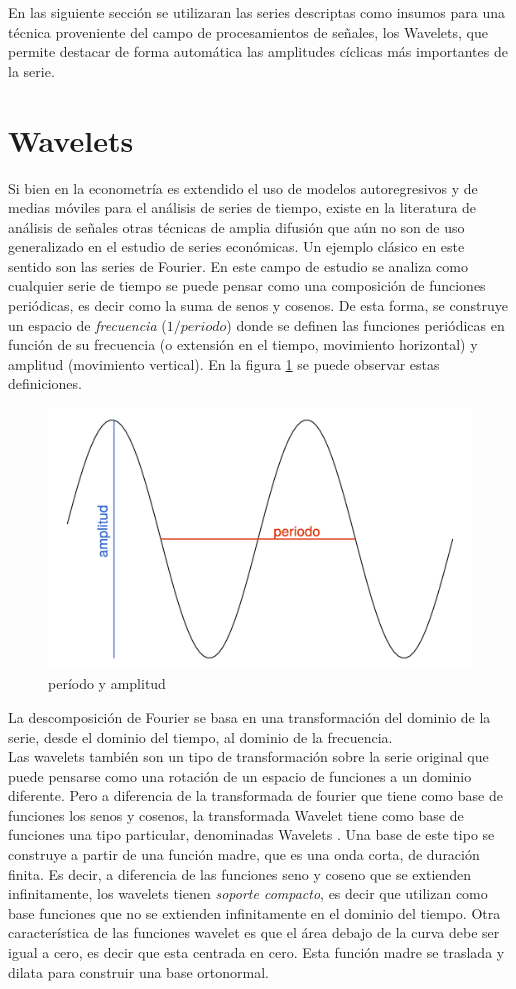 \documentclass[a4paper]{article}
\begin{document}
En las siguiente sección se utilizaran las series descriptas como insumos para una técnica proveniente del campo de procesamientos de señales, los Wavelets, que permite destacar de forma automática las amplitudes cíclicas más importantes de la serie.

\section{Wavelets}

Si bien en la econometría es extendido el uso de modelos autoregresivos y de medias móviles para el análisis de series de tiempo, existe en la literatura de análisis de señales otras técnicas de amplia difusión que aún no son de uso generalizado en el estudio de series económicas. Un ejemplo clásico en este sentido son las series de Fourier. En este campo de estudio se analiza como cualquier serie de tiempo se puede pensar como una composición de funciones periódicas, es decir como la suma de senos y cosenos. De esta forma, se construye un espacio de \textit{frecuencia} ($1/periodo$) donde se definen las funciones periódicas en función de su frecuencia (o extensión en el tiempo, movimiento horizontal) y amplitud (movimiento vertical). En la figura \ref{fig:ciclo} se puede observar estas definiciones.

\begin{figure}[H]
	\centering
	\includegraphics[width=0.65\linewidth]{ciclo.png}
	\caption{período y amplitud} \label{fig:ciclo}
\end{figure}

La descomposición de Fourier se basa en una transformación del dominio de la serie, desde el dominio del tiempo, al dominio de la frecuencia.\\

Las wavelets también son un tipo de transformación sobre la serie original que puede pensarse como una rotación de un espacio de funciones a un dominio diferente. Pero a diferencia de la transformada de fourier que tiene como base de funciones los senos y cosenos, la transformada Wavelet tiene como base de funciones una tipo particular, denominadas Wavelets \cite{castro1995wavelets}. Una base de este tipo se construye a partir de una función madre, que es una onda corta, de duración finita. Es decir, a diferencia de las funciones seno y coseno que se extienden infinitamente, los wavelets tienen \textit{soporte compacto}, es decir que utilizan como base funciones que no se extienden infinitamente en el dominio del tiempo. Otra característica de las funciones wavelet es que el área debajo de la curva debe ser igual a cero, es decir que esta centrada en cero. Esta función madre se traslada y dilata para construir una base ortonormal. 
\end{document}
